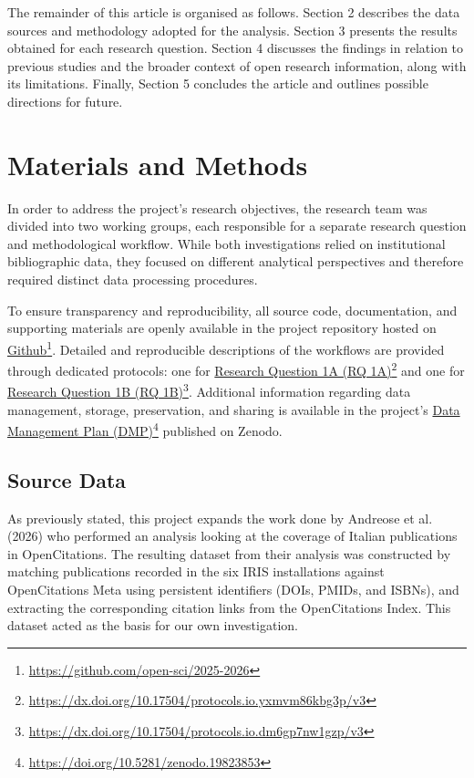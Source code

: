 \documentclass[year=2026]{cup-journal}
\begin{document}
The remainder of this article is organised as follows. Section 2 describes the data sources and methodology adopted for the analysis. Section 3 presents the results obtained for each research question. Section 4 discusses the findings in relation to previous studies and the broader context of open research information, along with its limitations. Finally, Section 5 concludes the article and outlines possible directions for future.

\section{Materials and Methods}

In order to address the project's research objectives, the research team was divided into two working groups, each responsible for a separate research question and methodological workflow. While both investigations relied on institutional bibliographic data, they focused on different analytical perspectives and therefore required distinct data processing procedures.

To ensure transparency and reproducibility, all source code, documentation, and supporting materials are openly available in the project repository hosted on \href{https://github.com/open-sci/2025-2026}{Github}\footnote{\url{https://github.com/open-sci/2025-2026}}. Detailed and reproducible descriptions of the workflows are provided through dedicated protocols: one for \href{https://dx.doi.org/10.17504/protocols.io.yxmvm86kbg3p/v3}{Research Question 1A (RQ 1A)}\footnote{\url{https://dx.doi.org/10.17504/protocols.io.yxmvm86kbg3p/v3}} and one for \href{https://dx.doi.org/10.17504/protocols.io.dm6gp7nw1gzp/v3}{Research Question 1B (RQ 1B)}\footnote{\url{https://dx.doi.org/10.17504/protocols.io.dm6gp7nw1gzp/v3}}. Additional information regarding data management, storage, preservation, and sharing is available in the project's \href{https://doi.org/10.5281/zenodo.19823853}{Data Management Plan (DMP)}\footnote{\url{https://doi.org/10.5281/zenodo.19823853}} published on Zenodo.

\subsection{Source Data}

As previously stated, this project expands the work done by Andreose et al. (2026) who performed an analysis looking at the coverage of Italian publications in OpenCitations. The resulting dataset  from their analysis was constructed by matching publications recorded in the six IRIS installations against OpenCitations Meta using persistent identifiers (DOIs, PMIDs, and ISBNs), and extracting the corresponding citation links from the OpenCitations Index. This dataset acted as the basis for our own investigation. 
\end{document}
